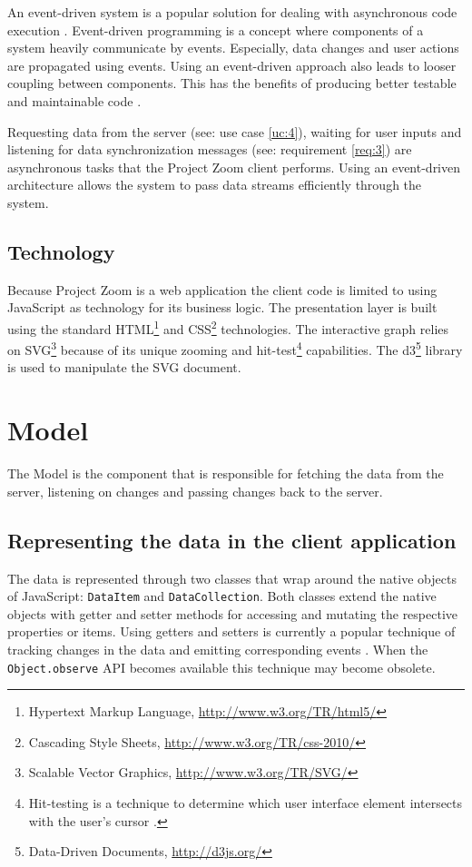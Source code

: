 An event-driven system is a popular solution for dealing with asynchronous code execution \cite{Michelson_2006}. Event-driven programming is a concept where components of a system heavily communicate by events. Especially, data changes and user actions are propagated using events. Using an event-driven approach also leads to looser coupling between components. This has the benefits of producing better testable and maintainable code \cite{Faison_2011}. 

Requesting data from the server (see: use case \ref{uc:4}), waiting for user inputs and listening for data synchronization messages (see: requirement \ref{req:3}) are asynchronous tasks that the Project Zoom client performs. Using an event-driven architecture allows the system to pass data streams efficiently through the system.

\subsection{Technology}
Because Project Zoom is a web application the client code is limited to using JavaScript as technology for its business logic. The presentation layer is built using the standard HTML\footnote{Hypertext Markup Language, \url{http://www.w3.org/TR/html5/}} and CSS\footnote{Cascading Style Sheets, \url{http://www.w3.org/TR/css-2010/}} technologies. The interactive graph relies on SVG\footnote{Scalable Vector Graphics, \url{http://www.w3.org/TR/SVG/}} because of its unique zooming and hit-test\footnote{Hit-testing is a technique to determine which user interface element intersects with the user's cursor \cite{Foley_1995}.} capabilities. The d3\footnote{Data-Driven Documents, \url{http://d3js.org/}} library is used to manipulate the SVG document.

\section{Model}

The Model is the component that is responsible for fetching the data from the server, listening on changes and passing changes back to the server.

\subsection{Representing the data in the client application}

The data is represented through two classes that wrap around the native objects of JavaScript: \texttt{DataItem} and \texttt{DataCollection}. Both classes extend the native objects with getter and setter methods for accessing and mutating the respective properties or items. Using getters and setters is currently a popular technique of tracking changes in the data and emitting corresponding events . When the \texttt{Object.observe} API \cite{Waldron_2012} becomes available this technique may become obsolete. 

